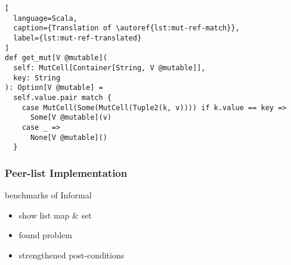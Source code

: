 \begin{lstlisting}[
  language=Scala,
  caption={Translation of \autoref{lst:mut-ref-match}},
  label={lst:mut-ref-translated}
]
def get_mut[V @mutable](
  self: MutCell[Container[String, V @mutable]],
  key: String
): Option[V @mutable] =
  self.value.pair match {
    case MutCell(Some(MutCell(Tuple2(k, v)))) if k.value == key =>
      Some[V @mutable](v)
    case _ =>
      None[V @mutable]()
  }
\end{lstlisting}

\subsubsection{Peer-list Implementation}
benchmarks of Informal

\begin{itemize}
  \item show list map \& set
  \item found problem
  \item strengthened post-conditions
\end{itemize}
